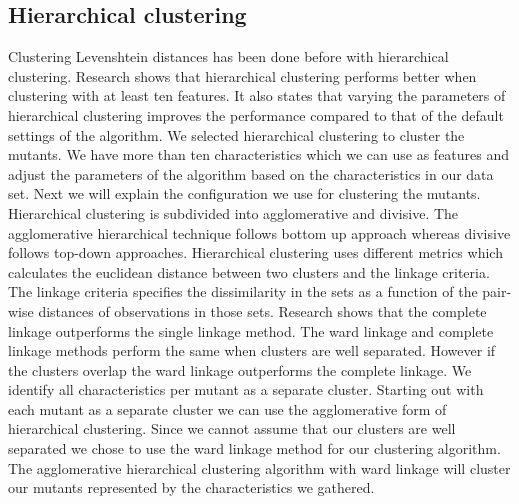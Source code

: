 \documentclass[../../main]{subfiles}
\begin{document}
\subsection{Hierarchical clustering}
Clustering Levenshtein distances has been done before with hierarchical clustering\cite{Rajalingam2011, Gothai2010PerformanceAlgorithms}. 
Research shows that hierarchical clustering performs better when clustering with at least ten features\cite{Rodriguez2019}.
It also states that varying the parameters of hierarchical clustering improves the performance compared to that of the default settings of the algorithm\cite{Rodriguez2019}.
We selected hierarchical clustering to cluster the mutants.
We have more than ten characteristics which we can use as features and adjust the parameters of the algorithm based on the characteristics in our data set.
Next we will explain the configuration we use for clustering the mutants. 
\newline
Hierarchical clustering is subdivided into agglomerative and divisive. 
The agglomerative hierarchical technique follows bottom up approach whereas divisive follows top-down approaches.
Hierarchical clustering uses different metrics which calculates the euclidean distance between two clusters and the linkage criteria\cite{Rajalingam2011}. 
The linkage criteria specifies the dissimilarity in the sets as a function of the pair-wise distances of observations in those sets\cite{Rajalingam2011}.
\newline
Research shows that the complete linkage outperforms the single linkage method\cite{Vijaya2019ComparativeClustering}.
The ward linkage and complete linkage methods perform the same when clusters are well separated\cite{Vijaya2019ComparativeClustering}.
However if the clusters overlap the ward linkage outperforms the complete linkage\cite{Vijaya2019ComparativeClustering}.
\newline
We identify all characteristics per mutant as a separate cluster.
Starting out with each mutant as a separate cluster we can use the agglomerative form of hierarchical clustering.
Since we cannot assume that our clusters are well separated we chose to use the ward linkage method for our clustering algorithm.
The agglomerative hierarchical clustering algorithm with ward linkage will cluster our mutants represented by the characteristics we gathered.
\end{document}
